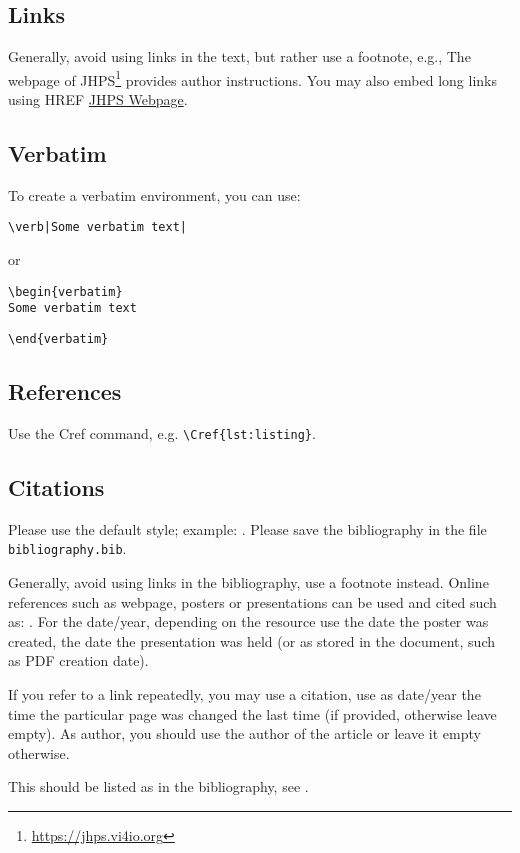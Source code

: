 \documentclass{jhps}
\begin{document}
\subsection{Links}
Generally, avoid using links in the text, but rather use a footnote, e.g.,
The webpage of JHPS\footnote{\url{https://jhps.vi4io.org}} provides author instructions.
You may also embed long links using HREF \href{https://jhps.vi4io.org}{JHPS Webpage}.

\subsection{Verbatim}
To create a verbatim environment, you can use:
\begin{verbatim}
\verb|Some verbatim text|
\end{verbatim}
or
\begin{verbatim}
\begin{verbatim}
Some verbatim text
\end{verbatim}
\vspace*{-0.8em}
\verb|\end{verbatim}|

\subsection{References}

Use the Cref command, e.g. \verb|\Cref{lst:listing}|.\subsection{Citations}

Please use the default style; example: \cite{misc1998}.
Please save the bibliography in the file \texttt{bibliography.bib}.

Generally, avoid using links in the bibliography, use a footnote instead.
Online references such as webpage, posters or presentations can be used and cited such as: \cite{link20pres, link20post, link20web}.
For the date/year, depending on the resource use the date the poster was created, the date the presentation was held (or as stored in the document, such as PDF creation date).

If you refer to a link repeatedly, you may use a citation, use as date/year the time the particular page was changed the last time (if provided, otherwise leave empty).
As author, you should use the author of the article or leave it empty otherwise.

This should be listed as in the bibliography, see .
\begin{lstfloat}

\end{lstfloat}
\end{document}
